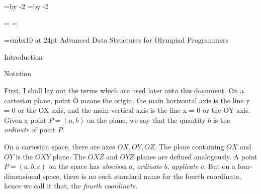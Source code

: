 \hsize=\pdfpagewidth  \advance\hsize by -2\marg
\vsize=\pdfpageheight \advance\vsize by -2\marg

\headline={}
\footline={\hss\folio\hss}



\fontfam[Pagella]
\typosize[12/14.5]

\rm



\newcount\thmno {}

\newcount\stmtno {}

\def\statement#1#2{%
  \global\advance\stmtno by 1
  \wlabel{\the\stmtno}%
  \par\medskip\noindent{\bf #1 \the\stmtno. }#2\par\medskip
}


\def\definition#1{\statement{Definition}{#1}}
\def\lemma#1{\statement{Lemma}{#1}}
\def\proposition#1{\statement{Proposition}{#1}}
\def\theorem#1{\statement{Theorem}{#1}}
\def\exercise#1{\statement{Exercise}{#1}}
\def\example#1{\statement{Example}{#1}}


\def\qed{\hfill$\square$}
\def\proof#1{%
  \par\medskip\noindent{\it Proof. }#1\qed\par\medskip
}


\rm




{\font\FN=cmbx10 at 24pt \FN
  \tit \FN Advanced Data Structures for Olympiad Programmers
}

\eject

\maketoc
\vfill

\eject


\sec Introduction

\secc Notation

First, I shall lay out the terms which are used later onto this document.  On a cartesian plane, point O means the origin, the main horizontal axis is the line y = 0 or the OX axis, and the main vertical axis is the line x = 0 or the OY axis.  Given a point $P = (a, b)$ on the plane, we say that the quantity $b$ is the {\it ordinate} of point $P$.

On a cartesian space, there are axes $OX, OY, OZ$.  The plane containing $OX$ and $OY$ is the $OXY$ plane.  The $OXZ$ and $OYZ$ planes are defined analogously.  A point $P = (a, b, c)$ on the space has {\it abscissa} $a$, {\it ordinate} $b$, {\it applicate} $c$.  But on a four-dimensional space, there is no such standard name for the fourth coordinate, hence we call it that, the {\it fourth coordinate}.

